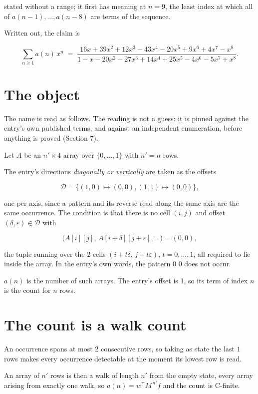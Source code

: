 \documentclass[11pt]{article}
\theoremstyle{definition}
\begin{document}
stated without a range; it first has meaning at $n = 9$, the least index at which all of $a(n-1),\dots,a(n-8)$ are terms of the sequence.

Written out, the claim is

\[\sum_{n \ge 1} a(n)\,x^n \;=\; \frac{16x + 39x^{2} + 12x^{3} - 43x^{4} - 20x^{5} + 9x^{6} + 4x^{7} - x^{8}}{1 - x - 20x^{2} - 27x^{3} + 14x^{4} + 25x^{5} - 4x^{6} - 5x^{7} + x^{8}}.\]

\section{The object}

The name is read as follows. The reading is not a guess: it is pinned against the entry's own published terms, and against an independent enumeration, before anything is proved (Section 7).

Let $A$ be an $n' \times 4$ array over $\{0,\dots,1\}$ with $n' = n$ rows.

The entry's directions {\itshape diagonally or vertically} are taken as the offsets

\[\mathcal{D} = \{(1,0)\mapsto(0,0), (1,1)\mapsto(0,0)\},\]

one per axis, since a pattern and its reverse read along the same axis are the same occurrence. The condition is that there is no cell $(i,j)$ and offset $(\delta,\varepsilon)\in\mathcal{D}$ with

\[\bigl(A[i][j],\,A[i{+}\delta][j{+}\varepsilon],\dots\bigr) = (0, 0),\]

the tuple running over the $2$ cells $(i+t\delta,\,j+t\varepsilon)$, $t = 0,\dots,1$, all required to lie inside the array. In the entry's own words, the pattern 0 0 does not occur.

$a(n)$ is the number of such arrays. The entry's offset is 1, so its term of index $n$ is the count for $n$ rows.

\section{The count is a walk count}

An occurrence spans at most $2$ consecutive rows, so taking as state the last $1$ rows makes every occurrence detectable at the moment its lowest row is read.

An array of $n'$ rows is then a walk of length $n'$ from the empty state, every array arising from exactly one walk, so $a(n) = w^{\mathsf T}M^{\,n'}f$ and the count is C-finite.
\end{document}
